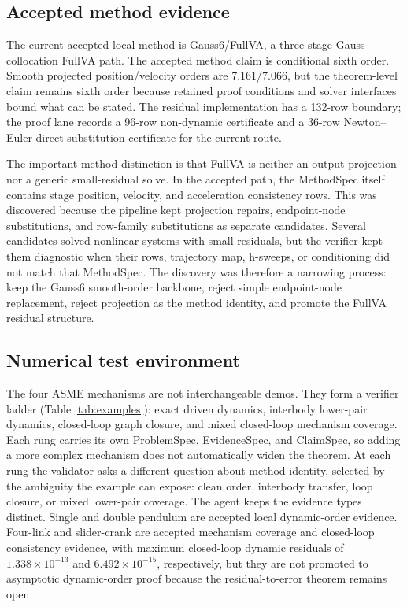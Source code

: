 \documentclass[10pt]{article}
\newcommand{\method}{Gauss6/\allowbreak FullVA}
\begin{document}
\subsection{Accepted method evidence}

The current accepted local method is \method{}, a three-stage Gauss-collocation
FullVA path. The accepted method claim is conditional sixth order. Smooth
projected position/velocity orders are 7.161/7.066, but the theorem-level
claim remains sixth order because retained proof conditions and solver
interfaces bound what can be stated. The residual implementation has a 132-row
boundary; the proof lane records a 96-row non-dynamic certificate and a
36-row Newton--Euler direct-substitution certificate for the current route.

The important method distinction is that FullVA is neither an output projection
nor a generic small-residual solve. In the accepted path, the MethodSpec itself
contains stage position, velocity, and acceleration consistency rows. This was
discovered because the pipeline kept projection repairs, endpoint-node
substitutions, and row-family substitutions as separate candidates. Several
candidates solved nonlinear systems with small residuals, but the verifier kept
them diagnostic when their rows, trajectory map, h-sweeps, or conditioning did
not match that MethodSpec. The discovery was therefore a narrowing process:
keep the Gauss6 smooth-order backbone, reject simple endpoint-node replacement,
reject projection as the method identity, and promote the FullVA residual
structure.

\subsection{Numerical test environment}

The four ASME mechanisms are not interchangeable demos. They form a verifier
ladder (Table \ref{tab:examples}): exact driven dynamics, interbody lower-pair
dynamics, closed-loop graph closure, and mixed closed-loop mechanism coverage.
Each rung carries its own ProblemSpec, EvidenceSpec, and ClaimSpec, so adding a
more complex mechanism does not automatically widen the theorem. At each rung
the validator asks a different question about method identity, selected by the
ambiguity the example can expose: clean order, interbody transfer, loop
closure, or mixed lower-pair coverage. The agent keeps the evidence types
distinct. Single and double pendulum are accepted local dynamic-order evidence.
Four-link and slider-crank are accepted mechanism coverage and closed-loop
consistency evidence, with maximum
closed-loop dynamic residuals of $1.338\times10^{-13}$ and
$6.492\times10^{-15}$, respectively, but they are not promoted to asymptotic
dynamic-order proof because the residual-to-error theorem remains open.
\end{document}
